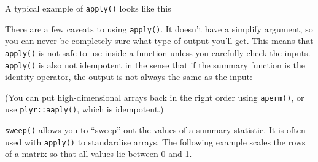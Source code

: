 A typical example of \texttt{apply()} looks like this

\begin{Shaded}
\begin{Highlighting}[]
\StringTok{ }\NormalTok{(}\NormalTok{:}\NormalTok{, } \NormalTok{)}
\end{Highlighting}
\end{Shaded}

There are a few caveats to using \texttt{apply()}. It doesn't have a
simplify argument, so you can never be completely sure what type of
output you'll get. This means that \texttt{apply()} is not safe to use
inside a function unless you carefully check the inputs.
\texttt{apply()} is also not idempotent in the sense that if the summary
function is the identity operator, the output is not always the same as
the input:

\begin{Shaded}
\begin{Highlighting}[]
\StringTok{ }
\StringTok{ }
\end{Highlighting}
\end{Shaded}

(You can put high-dimensional arrays back in the right order using
\texttt{aperm()}, or use \texttt{plyr::aaply()}, which is idempotent.)

\texttt{sweep()} allows you to ``sweep'' out the values of a summary
statistic. It is often used with \texttt{apply()} to standardise arrays.
The following example scales the rows of a matrix so that all values lie
between 0 and 1. 

\begin{Shaded}
\begin{Highlighting}[]
\StringTok{ }\NormalTok{(}\NormalTok{(}\NormalTok{, }\NormalTok{, }\NormalTok{), } \NormalTok{)}
\StringTok{ }\NormalTok{, }\DataTypeTok{-}\NormalTok{)}
\StringTok{ }\NormalTok{, }\DataTypeTok{/}\NormalTok{)}
\end{Highlighting}
\end{Shaded}

